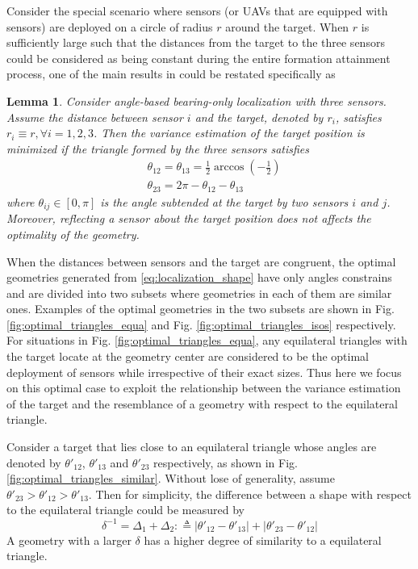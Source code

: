 \documentclass[times]{rncauth}
\newtheorem{lem}{Lemma}[section]
\begin{document}
Consider the special scenario where sensors (or UAVs that are
equipped with sensors) are deployed on a circle of radius $r$ around
the target. When $r$ is sufficiently large such that the distances
from the target to the three sensors could be considered as being
constant during the entire formation attainment process, one of the
main results in \cite{Bishop10sensor} could be restated specifically
as
\begin{lem}
  Consider angle-based bearing-only localization with three sensors. Assume the distance between sensor $i$ and the
  target, denoted by $r_i$, satisfies $r_i\equiv r,\forall i=1,2,3$.
  Then the variance estimation of the target position is minimized
  if the triangle formed by the three sensors satisfies
  \begin{align}
    &\theta_{12}=\theta_{13}=\frac{1}{2}\arccos(-\frac{1}{2})\nonumber\\
    &\theta_{23}=2\pi
    -\theta_{12}-\theta_{13}\label{eq:localization_shape}
  \end{align}
  where  $\theta_{ij}\in[0,\pi]$ is the angle subtended at the target by two sensors $i$ and
  $j$. Moreover, reflecting a sensor about the target position does not
affects the optimality of the geometry.
\end{lem}
When  the distances between sensors and the target are congruent,
the optimal geometries generated from \eqref{eq:localization_shape}
have only angles constrains and are divided into two subsets where
geometries in each of them are similar ones. Examples of the optimal
geometries in the two subsets are shown in Fig.
\ref{fig:optimal_triangles_equa} and Fig.
\ref{fig:optimal_triangles_isos} respectively. For situations in
Fig. \ref{fig:optimal_triangles_equa}, any equilateral triangles
with the target locate at the geometry center are considered to be
the optimal deployment of sensors while irrespective of their exact
sizes. Thus here we focus on this optimal case to exploit the
relationship between the variance estimation of the target and the
resemblance of a geometry with respect to the equilateral triangle.

Consider a target that lies close to an equilateral triangle whose
angles are denoted by $\theta'_{12}$, $\theta'_{13}$ and
$\theta'_{23}$ respectively, as shown in Fig.
\ref{fig:optimal_triangles_similar}. Without lose of generality,
assume $\theta'_{23}>\theta'_{12}>\theta'_{13}$. Then for simplicity, the
difference between a shape with respect to the
equilateral triangle could be measured by
\begin{equation}\label{eq:similarity}
  \delta^{-1}=\Delta_1+\Delta_2:\triangleq
  |\theta'_{12}-\theta'_{13}|+|\theta'_{23}-\theta'_{12}|
\end{equation}
A geometry with a larger $\delta$ has a higher degree of similarity
to a equilateral triangle.
\end{document}
